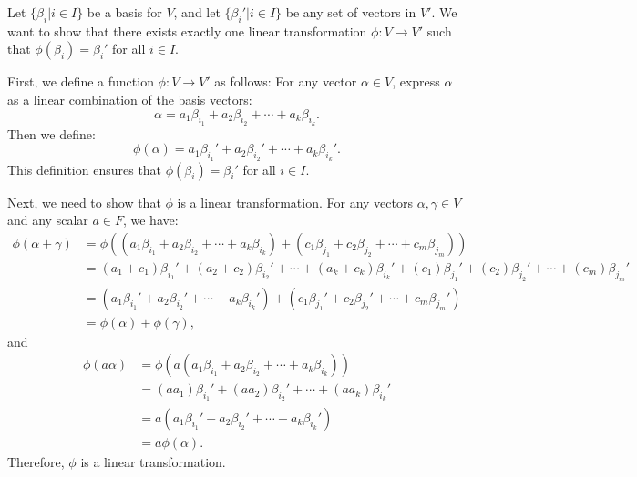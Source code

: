 \begin{solution}[(ii)]
  Let $\{\beta_i | i \in I\}$ be a basis for $V$, and let $\{\beta_i' | i \in I\}$ be any set of vectors in $V'$. We want to show that there exists exactly one linear transformation $\phi : V \to V'$ such that $\phi(\beta_i) = \beta_i'$ for all $i \in I$.

  First, we define a function $\phi : V \to V'$ as follows: For any vector $\alpha \in V$, express $\alpha$ as a linear combination of the basis vectors:
  \[%
    \alpha = a_1\beta_{i_1} + a_2\beta_{i_2} + \cdots + a_k\beta_{i_k}
  .\]%
  Then we define:
  \[%
    \phi(\alpha) = a_1\beta_{i_1}' + a_2\beta_{i_2}' + \cdots + a_k\beta_{i_k}'
  .\]%
  This definition ensures that $\phi(\beta_i) = \beta_i'$ for all $i \in I$.

  Next, we need to show that $\phi$ is a linear transformation. For any vectors $\alpha, \gamma \in V$ and any scalar $a \in F$, we have:
  \begin{align*}
    \phi(\alpha + \gamma) &= \phi((a_1\beta_{i_1} + a_2\beta_{i_2} + \cdots + a_k\beta_{i_k}) + (c_1\beta_{j_1} + c_2\beta_{j_2} + \cdots + c_m\beta_{j_m})) \\
                          &= (a_1 + c_1)\beta_{i_1}' + (a_2 + c_2)\beta_{i_2}' + \cdots + (a_k + c_k)\beta_{i_k}' + (c_1)\beta_{j_1}' + (c_2)\beta_{j_2}' + \cdots + (c_m)\beta_{j_m}' \\
                          &= (a_1\beta_{i_1}' + a_2\beta_{i_2}' + \cdots + a_k\beta_{i_k}') + (c_1\beta_{j_1}' + c_2\beta_{j_2}' + \cdots + c_m\beta_{j_m}') \\
                          &= \phi(\alpha) + \phi(\gamma)
  ,\end{align*}
  and
  \begin{align*}
    \phi(a\alpha) &= \phi(a(a_1\beta_{i_1} + a_2\beta_{i_2} + \cdots + a_k\beta_{i_k})) \\
                  &= (aa_1)\beta_{i_1}' + (aa_2)\beta_{i_2}' + \cdots + (aa_k)\beta_{i_k}' \\
                  &= a(a_1\beta_{i_1}' + a_2\beta_{i_2}' + \cdots + a_k\beta_{i_k}') \\
                  &= a\phi(\alpha)
  .\end{align*}
  Therefore, $\phi$ is a linear transformation.
\end{solution}
